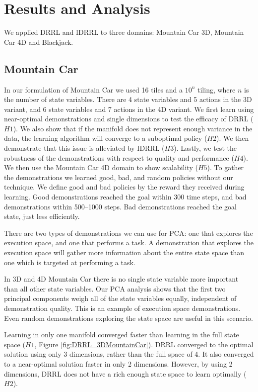 \documentclass[10pt,a4paper]{article}
\begin{document}
\section{Results and Analysis}
We applied DRRL and IDRRL to three domains: Mountain Car 3D, Mountain Car 4D and Blackjack.

\subsection{Mountain Car}

In our formulation of Mountain Car we used 16 tiles and a $10^n$ tiling, where $n$ is the number of state variables. There are 4 state variables and 5 actions in the 3D variant, and 6 state variables and 7 actions in the 4D variant. We first learn using near-optimal demonstrations and single dimensions to test the efficacy of DRRL ($H1$). We also show that if the manifold does not represent enough variance in the data, the learning algorithm will converge to a suboptimal policy ($H2$). We then demonstrate that this issue is alleviated by IDRRL ($H3$). Lastly, we test the robustness of the demonstrations with respect to quality and performance ($H4$). We then use the Mountain Car 4D domain to show scalability ($H5$). To gather the demonstrations we learned good, bad, and random policies without our technique. We define good and bad policies by the reward they received during learning. Good demonstrations reached the goal within 300 time steps, and bad demonstrations within 500--1000 steps. Bad demonstrations reached the goal state, just less efficiently. 

There are two types of demonstrations we can use for PCA: one that explores the execution space, and one that performs a task. A demonstration that explores the execution space will gather more information about the entire state space than one which is targeted at performing a task.

In 3D and 4D Mountain Car there is no single state variable more important than all other state variables. Our PCA analysis shows that the first two principal components weigh all of the state variables equally, independent of demonstration quality. This is an example of execution space demonstrations. Even random demonstrations exploring the state space are useful in this scenario. 

Learning in only one manifold converged faster than learning in the full state space ($H1$, Figure \ref{fig:DRRL_3DMountainCar}). DRRL converged to the optimal solution using only 3 dimensions, rather than the full space of 4. It also converged to a near-optimal solution faster in only 2 dimensions. However, by using 2 dimensions, DRRL does not have a rich enough state space to learn optimally ($H2$).
\end{document}
